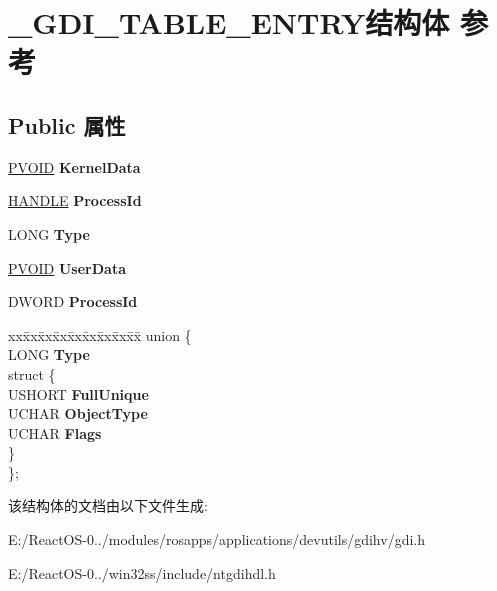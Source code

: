\hypertarget{struct___g_d_i___t_a_b_l_e___e_n_t_r_y}{}\section{\+\_\+\+G\+D\+I\+\_\+\+T\+A\+B\+L\+E\+\_\+\+E\+N\+T\+R\+Y结构体 参考}
\label{struct___g_d_i___t_a_b_l_e___e_n_t_r_y}
\subsection*{Public 属性}
\begin{DoxyCompactItemize}
\item 
\mbox{\label{struct___g_d_i___t_a_b_l_e___e_n_t_r_y_a4f9750d0a179464f513d15e6eb38c496}} 
\hyperlink{interfacevoid}{P\+V\+O\+ID} {\bfseries Kernel\+Data}
\item 
\mbox{\label{struct___g_d_i___t_a_b_l_e___e_n_t_r_y_acba8b6a562de2bb81b4f83e55ca16ff3}} 
\hyperlink{interfacevoid}{H\+A\+N\+D\+LE} {\bfseries Process\+Id}
\item 
\mbox{\label{struct___g_d_i___t_a_b_l_e___e_n_t_r_y_a4c87398cd139fd30b5aa0abeeb8fb3a3}} 
L\+O\+NG {\bfseries Type}
\item 
\mbox{\label{struct___g_d_i___t_a_b_l_e___e_n_t_r_y_af1091be52a84120aea685ee7fd649bf9}} 
\hyperlink{interfacevoid}{P\+V\+O\+ID} {\bfseries User\+Data}
\item 
\mbox{\label{struct___g_d_i___t_a_b_l_e___e_n_t_r_y_a016fcda951481d482683d97526de9473}} 
D\+W\+O\+RD {\bfseries Process\+Id}
\item 
\mbox{\label{struct___g_d_i___t_a_b_l_e___e_n_t_r_y_aae77fdeb9de2247a1dd01c42fbb6bc01}} 
\begin{tabbing}
xx\=xx\=xx\=xx\=xx\=xx\=xx\=xx\=xx\=\kill
union \{\\
\>LONG {\bfseries Type}\\
\mbox{\label{union___g_d_i___t_a_b_l_e___e_n_t_r_y_1_1_0D3754_a131e159605d09eca89e1291f43fbd0dc}} 
\>struct \{\\
\>\>USHORT {\bfseries FullUnique}\\
\>\>UCHAR {\bfseries ObjectType}\\
\>\>UCHAR {\bfseries Flags}\\
\>\} \\
\}; \\

\end{tabbing}\end{DoxyCompactItemize}


该结构体的文档由以下文件生成\+:\begin{DoxyCompactItemize}
\item 
E\+:/\+React\+O\+S-\/0../modules/rosapps/applications/devutils/gdihv/gdi.\+h\item 
E\+:/\+React\+O\+S-\/0../win32ss/include/ntgdihdl.\+h\end{DoxyCompactItemize}
